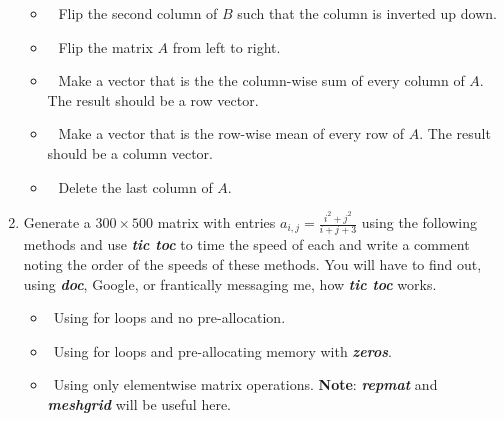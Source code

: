 \documentclass{article}
\begin{document}
\begin{enumerate}[leftmargin=0cm,itemindent=.5cm,labelwidth=\itemindent,labelsep=0cm,align=left,label=\textbf{\arabic*.}]
\begin{itemize}
		\item  $\:\:$ Flip the second column of $B$ such that the column is inverted up down.
		\item $\:\:$ Flip the matrix $A$ from left to right.
 		\item $\:\:$ Make a vector that is the the column-wise sum of every column of $A$. The result should be a row vector.
		 \item $\:\:$ Make a vector that is the row-wise mean of every row of $A$. The result should be a column vector.
 		 \item $\:\:$ Delete the last column of $A$. 
	\end{itemize}
	\pagebreak
\item Generate a $300 \times 500$ matrix with entries $a_{i,j} = \frac{i^2+j^2}{i+j+3} $ using the following methods and use \textit{\textbf{tic toc}} to time the speed of each and write a comment noting the order of the speeds of these methods. You will have to find out, using \textit{\textbf{doc}}, Google, or frantically messaging me, how \textit{\textbf{tic toc}} works.
	\begin{itemize}
 		\item $\:\:$Using for loops and no pre-allocation.
		 \item  $\:\:$Using for loops and pre-allocating memory with \textit{\textbf{zeros}}.
		 \item  $\:\:$Using only elementwise matrix operations. \textbf{Note}: \textit{\textbf{repmat}} and \textit{\textbf{meshgrid}} will be useful here.
	\end{itemize}
\end{enumerate}
\end{document}
